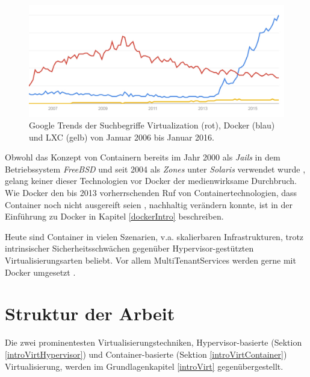 \documentclass[../main.tex]{subfiles}
\begin{document}
  \begin{figure}[h]
      \centering
      \includegraphics[width=1.0\textwidth]{./images/googletrend_dockerVirtualizationLXC.jpg}
      \caption{Google Trends der Suchbegriffe \glqq{}Virtualization\grqq{} (rot), \glqq{}Docker\grqq{} (blau) und \glqq{}LXC\grqq{} (gelb) von Januar 2006 bis Januar 2016\cite{googleTrends}.}
      \label{fig:overview_googleTrends}
  \end{figure}

  Obwohl das Konzept von Containern bereits im Jahr 2000 als \emph{Jails} in dem Betriebssystem \emph{FreeBSD} und seit 2004 als \emph{Zones} unter \emph{Solaris} verwendet wurde \cite{zonesReleasenotes}\cite{jailsReleasenotes}, gelang keiner dieser Technologien vor Docker der medienwirksame Durchbruch. Wie Docker den bis 2013 vorherrschenden Ruf von Containertechnologien, dass Container noch nicht ausgereift seien \cite[S.8]{containerVirtPerformance}, nachhaltig verändern konnte, ist in der Einführung zu Docker in Kapitel \ref{dockerIntro} beschreiben.

  Heute sind Container in vielen Szenarien, v.a. skalierbaren Infrastrukturen, trotz intrinsischer Sicherheitsschwächen gegenüber Hypervisor-gestützten Virtualisierungsarten beliebt. Vor allem \glspl{MultiTenantService} werden gerne mit Docker umgesetzt \cite[S.6]{dockerBook}\cite{dockerUnderstandingDocker}.



  \section{Struktur der Arbeit}
    Die zwei prominentesten Virtualisierungstechniken, Hypervisor-basierte (Sektion \ref{introVirtHypervisor}) und Container-basierte (Sektion \ref{introVirtContainer}) Virtualisierung, werden im Grundlagenkapitel \ref{introVirt} gegenübergestellt.
\end{document}

